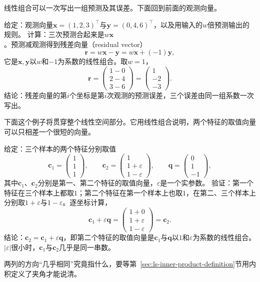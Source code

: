 线性组合可以一次写出一组预测及其误差。下面回到前面的观测向量。
\begin{example}[残差向量是线性组合]
\label{ex:ls-residual-vector}
给定：观测向量$\bm x=(1,2,3)^\top$与$\bm y=(0,4,6)^\top$，以及用输入的$w$倍预测输出的规则。
计算：三次预测合起来是$w\bm x$。预测减观测得到残差向量（residual vector）
\[
 \bm r=w\bm x-\bm y=w\bm x+(-1)\bm y,
\]
它是$\bm x,\bm y$以$w$和$-1$为系数的线性组合。取$w=1$，
\[
 \bm r=\begin{pmatrix}1-0\\2-4\\3-6\end{pmatrix}=\begin{pmatrix}1\\-2\\-3\end{pmatrix}.
\]
结论：残差向量的第$i$个坐标是第$i$次观测的预测误差，三个误差由同一组系数一次写出。
\end{example}

下面这个例子将贯穿整个线性空间部分。它用线性组合说明，两个特征的取值向量可以只相差一个很短的向量。
\begin{example}
\label{ex:ls-nearly-collinear-features}
给定：三个样本的两个特征分别取值
\begin{equation*}
 \bm c_1=\begin{pmatrix}1\\1\\1\end{pmatrix},\qquad
 \bm c_2=\begin{pmatrix}1\\1+\varepsilon\\1-\varepsilon\end{pmatrix},\qquad
 \bm q=\begin{pmatrix}0\\1\\-1\end{pmatrix},
\end{equation*}
其中$\bm c_1$、$\bm c_2$分别是第一、第二个特征的取值向量，$\varepsilon$是一个实参数。
验证：第一个特征在三个样本上都取$1$；第二个特征在第一个样本上也取$1$，在第二、三个样本上分别取$1+\varepsilon$与$1-\varepsilon$。逐坐标计算，
\[
 \bm c_1+\varepsilon\bm q=\begin{pmatrix}1+0\\1+\varepsilon\\1-\varepsilon\end{pmatrix}=\bm c_2.
\]
结论：$\bm c_2=\bm c_1+\varepsilon\bm q$，即第二个特征的取值向量是$\bm c_1$与$\bm q$以$1$和$\varepsilon$为系数的线性组合。$|\varepsilon|$很小时，$\bm c_1$与$\bm c_2$几乎是同一串数。
\end{example}
两列的方向“几乎相同”究竟指什么，要等第~\ref{sec:ls-inner-product-definition}节用内积定义了夹角才能说清。

